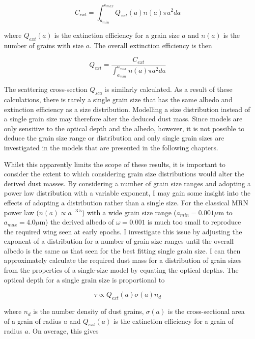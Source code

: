 \begin{equation}
C_{ext}=\int^{a_{max}}_{a_{min}} Q_{ext}(a) n(a) \pi a^2 da 
\end{equation}

where $Q_{ext}(a)$ is the extinction efficiency for a grain size $a$ and $n(a)$ is the number of grains with size $a$. The overall extinction efficiency is then

\begin{equation} 
Q_{ext} = \frac{C_{ext}}{ \int^{a_{max}}_{a_{min}} n(a) \pi a^2 da} 
\end{equation}
 
The scattering cross-section $Q_{sca}$ is similarly calculated.  As a result of these calculations, there is rarely a single grain size that has the same albedo and extinction efficiency as a size distribution.  Modelling a size distribution instead of a single grain size may therefore alter the deduced dust mass.  Since models are only sensitive to the optical depth and the albedo, however, it is not possible to deduce the grain size range or distribution and only single grain sizes are investigated in the models that are presented in the following chapters.

Whilst this apparently limits the scope of these results, it is important to consider the extent to which considering grain size distributions would alter the derived dust masses.  By considering a number of grain size ranges and adopting a power law distribution with a variable exponent, I may gain some insight into the effects of adopting a distribution rather than a single size.  For the classical MRN power law ($n(a) \propto a^{-3.5}$) with a wide grain size range ($a_{min} = 0.001 \mu$m to $a_{max} = 4.0 \mu$m) the derived albedo of $\omega=0.001$ is much too small to reproduce the required wing seen at early epochs.  I investigate this issue by adjusting the exponent of a distribution for a number of grain size ranges until the overall albedo is the same as that seen for the best fitting single grain size.  I can then approximately calculate the required dust mass for a distribution of grain sizes from the properties of a single-size model by equating the optical depths.  The optical depth for a single grain size is proportional to 

\begin{equation}
\tau \propto Q_{ext}(a)  \sigma(a) n_d
\end{equation}

\noindent where $n_d$ is the number density of dust grains, $\sigma(a)$ is the cross-sectional area of a grain of radius $a$ and $Q_{ext}(a)$ is the extinction efficiency for a grain of radius $a$.  On average, this gives

